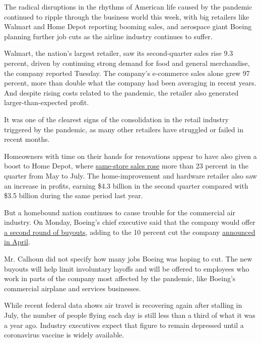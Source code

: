The radical disruptions in the rhythms of American life caused by the
pandemic continued to ripple through the business world this week, with
big retailers like Walmart and Home Depot reporting booming sales, and
aerospace giant Boeing planning further job cuts as the airline industry
continues to suffer.

Walmart, the nation's largest retailer, saw its second-quarter sales
rise 9.3 percent, driven by continuing strong demand for food and
general merchandise, the company reported Tuesday. The company's
e-commerce sales alone grew 97 percent, more than double what the
company had been averaging in recent years. And despite rising costs
related to the pandemic, the retailer also generated
larger-than-expected profit.

It was one of the clearest signs of the consolidation in the retail
industry triggered by the pandemic, as many other retailers have
struggled or failed in recent months.

Homeowners with time on their hands for renovations appear to have also
given a boost to Home Depot, where
\href{https://www.nytimes3xbfgragh.onion/live/2020/08/18/business/stock-market-today-coronavirus\#home-depot-reports-surge-in-second-quarter-sales}{same-store
sales rose} more than 23 percent in the quarter from May to July. The
home-improvement and hardware retailer also saw an increase in profits,
earning \$4.3 billion in the second quarter compared with \$3.5 billion
during the same period last year.

But a homebound nation continues to cause trouble for the commercial air
industry. On Monday, Boeing's chief executive said that the company
would offer
\href{https://www.nytimes3xbfgragh.onion/live/2020/08/18/business/stock-market-today-coronavirus\#boeing-is-planning-deeper-job-cuts-ceo-says}{a
second round of buyouts}, adding to the 10 percent cut the company
\href{https://www.nytimes3xbfgragh.onion/2020/04/29/business/boeing-layoffs-coronavirus.html}{announced
in April}.

Mr. Calhoun did not specify how many jobs Boeing was hoping to cut. The
new buyouts will help limit involuntary layoffs and will be offered to
employees who work in parts of the company most affected by the
pandemic, like Boeing's commercial airplane and services businesses.

While recent federal data shows air travel is recovering again after
stalling in July, the number of people flying each day is still less
than a third of what it was a year ago. Industry executives expect that
figure to remain depressed until a coronavirus vaccine is widely
available.

